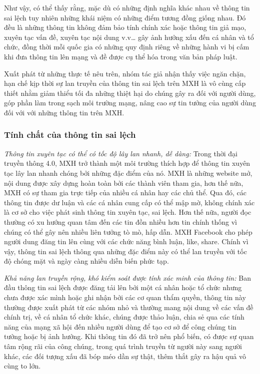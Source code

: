 		Như vậy, có thể thấy rằng, mặc dù có những định nghĩa khác nhau về thông tin sai lệch tuy nhiên những khái niệm có những điểm tương đồng giống nhau. Đó đều là những thông tin không đảm bảo tính chính xác hoặc thông tin giả mạo, xuyên tạc vấn đề, xuyên tạc nội dung v.v… gây ảnh hưởng xấu đến cá nhân và tổ chức, đồng thời mỗi quốc gia có những quy định riêng về những hành vi bị cấm khi đưa thông tin lên mạng và đề được cụ thể hóa trong văn bản pháp luật.
		
		Xuất phát từ những thực tế nêu trên, nhóm tác giả nhận thấy việc ngăn chặn, hạn chế kịp thời sự lan truyền của thông tin sai lệch trên MXH là vô cùng cấp thiết nhằm giảm thiểu tối đa những thiệt hại do chúng gây ra đối với người dùng, góp phần làm trong sạch môi trường mạng, nâng cao sự tin tưởng của người dùng đối với với những thông tin trên MXH. 
		\subsubsection{Tính chất của thông tin sai lệch}
		{\itshape Thông tin xuyên tạc có thể có tốc độ lây lan nhanh, dễ dàng: }Trong thời đại truyền thông 4.0, MXH trở thành một môi trường thích hợp để thông tin xuyên tạc lây lan nhanh chóng bởi những đặc điểm của nó. MXH là những website mở, nội dung được xây dựng hoàn toàn bởi các thành viên tham gia, hơn thế nữa, MXH có sự tham gia trực tiếp của nhiều cá nhân hay các chủ thể. Qua đó, các thông tin được dư luận và các cá nhân cung cấp có thể mập mờ, không chính xác là cơ sở cho việc phát sinh thông tin xuyên tạc, sai lệch. Hơn thế nữa, người đọc thường có xu hướng quan tâm đến các tin đồn nhiều hơn tin chính thống vì chúng có thể gây nên nhiều liên tưởng tò mò, hấp dẫn. MXH Facebook cho phép người dung đăng tin lên cùng với các chức năng bình luận, like, share. Chính vì vậy, thông tin sai lệch thông qua những đặc điểm này có thể lan truyền với tốc độ chóng mặt và ngày càng nhiều diễn biến phức tạp.
		
		{\itshape Khả năng lan truyền rộng, khó kiểm soát được tính xác minh của thông tin: }Ban đầu thông tin sai lệch được đăng tải lên bởi một cá nhân hoặc tổ chức nhưng chưa được xác mình hoặc ghi nhận bởi các cơ quan thẩm quyền, thông tin này thường được xuất phát từ các nhóm nhỏ và thường mang nội dung về các vấn đề chính trị, về cá nhân tổ chức khác, chúng được thảo luận, chia sẻ qua các tính năng của mạng xã hội đến nhiều người dùng để tạo cơ sở để công chúng tin tưởng hoặc bị ảnh hưởng. Khi thông tin đó đã trở nên phổ biến, có được sự quan tâm rộng rãi của công chúng, trong quá trình truyền từ người này sang người khác, các đối tượng xấu đã bóp méo dần sự thật, thêm thắt gây ra hậu quả vô cùng to lớn.
		
